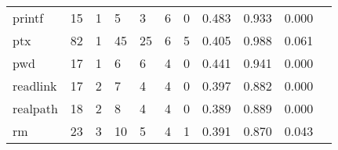 \begin{longtable}{lp{1.2cm}p{1.2cm}p{1.2cm}p{1.2cm}p{1.2cm}p{1.2cm}p{1.2cm}p{1.2cm}p{1.2cm}p{1.2cm}}
printf    &                                    15 &                                                  1 &                                                  5 &                                                  3 &                                                  6 &                                                  0 &                                              0.483 &                                              0.933 &                                              0.000 \\
ptx       &                                    82 &                                                  1 &                                                 45 &                                                 25 &                                                  6 &                                                  5 &                                              0.405 &                                              0.988 &                                              0.061 \\
pwd       &                                    17 &                                                  1 &                                                  6 &                                                  6 &                                                  4 &                                                  0 &                                              0.441 &                                              0.941 &                                              0.000 \\
readlink  &                                    17 &                                                  2 &                                                  7 &                                                  4 &                                                  4 &                                                  0 &                                              0.397 &                                              0.882 &                                              0.000 \\
realpath  &                                    18 &                                                  2 &                                                  8 &                                                  4 &                                                  4 &                                                  0 &                                              0.389 &                                              0.889 &                                              0.000 \\
rm        &                                    23 &                                                  3 &                                                 10 &                                                  5 &                                                  4 &                                                  1 &                                              0.391 &                                              0.870 &                                              0.043 \\

\end{longtable}

